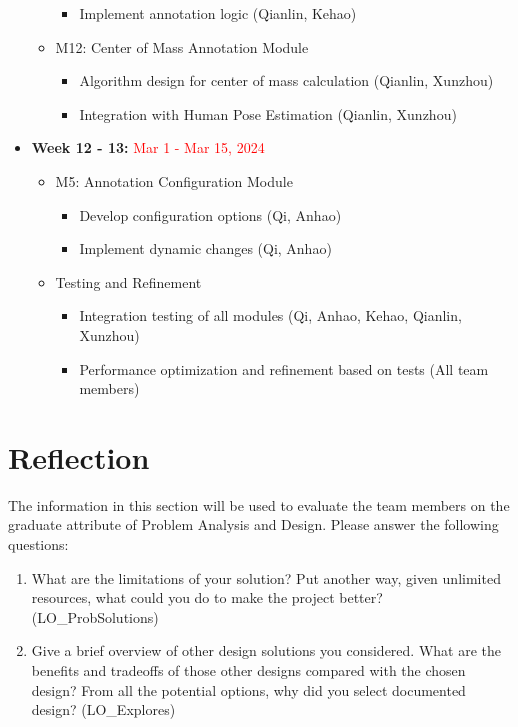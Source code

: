 \documentclass[12pt, titlepage]{article}
\newcommand{\rt}[1]{\textcolor{red}{#1}}
\begin{document}
\begin{itemize}
\begin{itemize}
\begin{itemize}
          \item Implement annotation logic (Qianlin, Kehao)
      \end{itemize}
      \item M12: Center of Mass Annotation Module
      \begin{itemize}
          \item Algorithm design for center of mass calculation (Qianlin, Xunzhou)
          \item Integration with Human Pose Estimation (Qianlin, Xunzhou)
      \end{itemize}
  \end{itemize}
  \item \textbf{Week 12 - 13:} \rt{Mar 1 - Mar 15, 2024}
  \begin{itemize}
      \item M5: Annotation Configuration Module
      \begin{itemize}
          \item Develop configuration options (Qi, Anhao)
          \item Implement dynamic changes (Qi, Anhao)
      \end{itemize}
      \item Testing and Refinement
      \begin{itemize}
          \item Integration testing of all modules (Qi, Anhao, Kehao, Qianlin, Xunzhou)
          \item Performance optimization and refinement based on tests (All team members)
      \end{itemize}
  \end{itemize}
\end{itemize}

\section{Reflection}

The information in this section will be used to evaluate the team members on the
graduate attribute of Problem Analysis and Design.  Please answer the following questions:

\begin{enumerate}
  \item What are the limitations of your solution?  Put another way, given
  unlimited resources, what could you do to make the project better? (LO\_ProbSolutions)
  \item Give a brief overview of other design solutions you considered.  What
  are the benefits and tradeoffs of those other designs compared with the chosen
  design?  From all the potential options, why did you select documented design?
  (LO\_Explores)
\end{enumerate}
\end{document}
